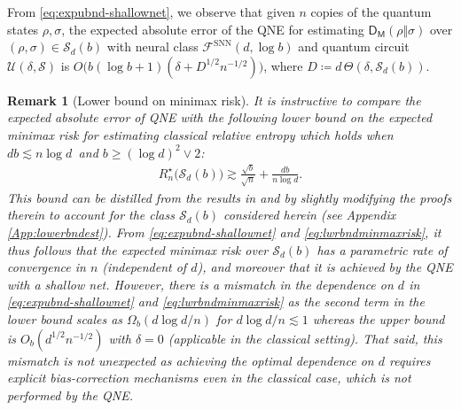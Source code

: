 \documentclass[a4paper,onecolumn,11pt,accepted=2026-05-12]{quantumarticle}
\newtheorem{remark}{Remark}
\newcommand{\sD}{\mathsf{D}}
\newcommand{\cF}{\mathcal{F}}
\newcommand{\cS}{\mathcal{S}}
\newcommand{\cU}{\mathcal{U}}
\begin{document}
From \eqref{eq:expubnd-shallownet}, we observe  that given $n$ copies of the quantum states $\rho,\sigma$, the expected absolute error of the QNE for estimating  $\sD_{\mathsf{M}}(\rho\Vert\sigma)$ over  $(\rho,\sigma) \in \cS_d(b)$ with neural class $\cF^{\mathrm{SNN}}(d,\log  b )$ and quantum circuit $\cU(\delta,\cS)$ is $O\big(b(\log  b +1)(\delta+D^{1/2}n^{-1/2})\big)$, where $D \coloneqq d\,\Theta(\delta,\cS_d(b))$.
\begin{remark}[Lower bound on minimax risk]
   It is instructive to compare the expected absolute error of QNE with the following lower bound on the expected minimax risk for estimating classical relative entropy which holds 
when    $d b \lesssim n \log d\,$ and $b \geq (\log d)^2 \vee 2$: 
\begin{align}
R_n^{\star}\big(\cS_d(b)\big) \gtrsim \frac{\sqrt{b}}{\sqrt{n}}+\frac{d b}{n \log d}.\label{eq:lwrbndminmaxrisk}
\end{align}
This bound can be distilled from the results in \cite{Yihong-Yang-2016} and \cite{Yanjun-2020-alphadiv} by slightly modifying the proofs therein to account for the class $\cS_d(b)$ considered herein (see Appendix \ref{App:lowerbndest}).  From \eqref{eq:expubnd-shallownet} and \eqref{eq:lwrbndminmaxrisk}, it thus follows that the expected minimax risk over $\cS_d(b)$ has a  parametric rate  of convergence in $n$ (independent of $d$), and moreover that it is achieved by the QNE with a shallow net. However, there is a mismatch in the dependence on $d$ in \eqref{eq:expubnd-shallownet} and \eqref{eq:lwrbndminmaxrisk} as the second term in the lower bound scales as $\Omega_b(d \log d/n)$ for $d\log d/n \lesssim 1$ whereas the upper bound is $O_b(d^{1/2}n^{-1/2})$ with $\delta=0$ (applicable  in the classical setting). That said, this mismatch is not unexpected as achieving the optimal dependence on $d$ requires explicit bias-correction mechanisms even in the classical case, which is not performed by the QNE. 
\end{remark}
\end{document}

